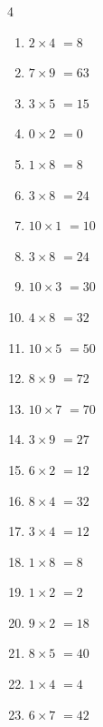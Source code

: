 \begin{multicols}{4}
\begin{enumerate}
  \item $2\times 4$
        $=8$

  \item $7\times 9$
        $=63$

  \item $3\times 5$
        $=15$

  \item $0\times 2$
        $=0$

  \item $1\times 8$
        $=8$

  \item $3\times 8$
        $=24$

  \item $10\times 1$
        $=10$

  \item $3\times 8$
        $=24$

  \item $10\times 3$
        $=30$

  \item $4\times 8$
        $=32$

  \item $10\times 5$
        $=50$

\columnbreak %

  \item $8\times 9$
        $=72$

  \item $10\times 7$
        $=70$

  \item $3\times 9$
        $=27$

  \item $6\times 2$
        $=12$

  \item $8\times 4$
        $=32$

  \item $3\times 4$
        $=12$

  \item $1\times 8$
        $=8$

  \item $1\times 2$
        $=2$

  \item $9\times 2$
        $=18$

  \item $8\times 5$
        $=40$

  \item $1\times 4$
        $=4$

  \item $6\times 7$
        $=42$


\end{enumerate}
\end{multicols}
